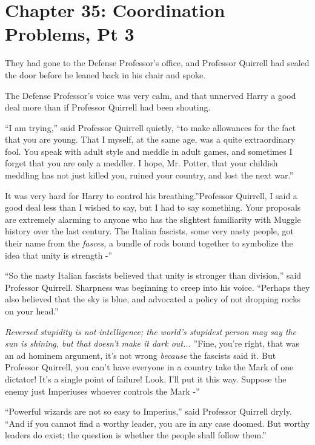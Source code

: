 \chapter{Chapter 35: Coordination Problems, Pt 3}
They had gone to the Defense Professor's office, and Professor Quirrell
had sealed the door before he leaned back in his chair and spoke.

The Defense Professor's voice was very calm, and that unnerved Harry a
good deal more than if Professor Quirrell had been shouting.

``I am trying,'' said Professor Quirrell quietly, ``to make allowances
for the fact that you are young. That I myself, at the same age, was a
quite extraordinary fool. You speak with adult style and meddle in adult
games, and sometimes I forget that you are only a meddler. I hope, Mr.
Potter, that your childish meddling has not just killed you, ruined your
country, and lost the next war.''

It was very hard for Harry to control his breathing.''Professor
Quirrell, I said a good deal less than I wished to say, but I had to say
something. Your proposals are extremely alarming to anyone who has the
slightest familiarity with Muggle history over the last century. The
Italian fascists, some very nasty people, got their name from the
\emph{fasces,} a bundle of rods bound together to symbolize the idea
that unity is strength -''

``So the nasty Italian fascists believed that unity is stronger than
division,'' said Professor Quirrell. Sharpness was beginning to creep
into his voice. ``Perhaps they also believed that the sky is blue, and
advocated a policy of not dropping rocks on your head.''

\emph{Reversed stupidity is not intelligence; the world's stupidest
person may say the sun is shining, but that doesn't make it dark
out...} ''Fine, you're right, that was an ad hominem argument, it's
not wrong \emph{because} the fascists said it. But Professor Quirrell,
you can't have everyone in a country take the Mark of one dictator! It's
a single point of failure! Look, I'll put it this way. Suppose the enemy
just Imperiuses whoever controls the Mark -''

``Powerful wizards are not so easy to Imperius,'' said Professor
Quirrell dryly. ``And if you cannot find a worthy leader, you are in any
case doomed. But worthy leaders do exist; the question is whether the
people shall follow them.''

